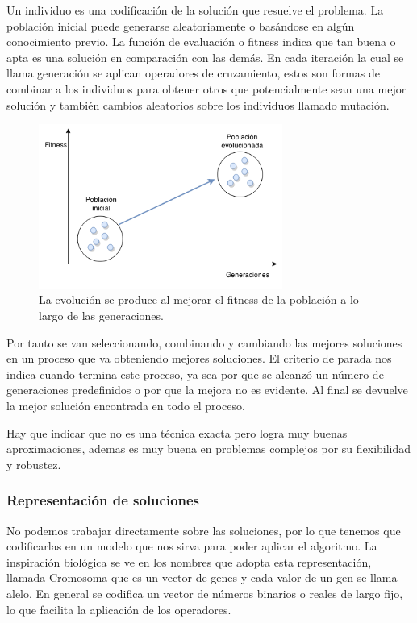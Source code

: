 Un individuo es una codificación de la solución que resuelve el problema.
La población inicial puede generarse aleatoriamente o basándose en algún conocimiento previo.
La función de evaluación o fitness indica que tan buena o apta es una solución en comparación con las demás.
En cada iteración la cual se llama generación se aplican operadores de cruzamiento, estos son formas de combinar a los individuos para obtener otros que potencialmente sean una mejor solución y también cambios aleatorios sobre los individuos llamado mutación.


\begin{figure}[H]
	\centering
	\includegraphics[width=8cm]{Figures/fitness_generaciones}
	\caption{La evolución se produce al mejorar el fitness de la población a lo largo de las generaciones.}
	\label{fig:fitness_generaciones}
\end{figure}



Por tanto se van seleccionando, combinando y cambiando las mejores soluciones en un proceso que va obteniendo mejores soluciones.
El criterio de parada nos indica cuando termina este proceso, ya sea por que se alcanzó un número de generaciones predefinidos o por que la mejora no es evidente. Al final se devuelve la mejor solución encontrada en todo el proceso.

Hay que indicar que no es una técnica exacta pero logra muy buenas aproximaciones, ademas es muy buena en problemas complejos por su flexibilidad y robustez. 


\subsubsection{Representación de soluciones}
No podemos trabajar directamente sobre las soluciones, por lo que tenemos que codificarlas en un modelo que nos sirva para poder aplicar el algoritmo.
La inspiración biológica se ve en los nombres que adopta esta representación, llamada Cromosoma que es un vector de genes y cada valor de un gen se llama alelo.
En general se codifica un vector de números binarios o reales de largo fijo, lo que facilita la aplicación de los operadores.

